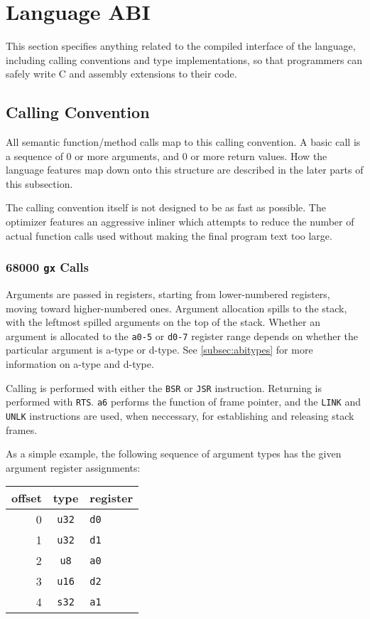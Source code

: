 \section{Language ABI}
\label{sec:abi}

This section specifies anything related to the compiled interface of
the language, including calling conventions and type implementations,
so that programmers can safely write C and assembly extensions to their
\gx{} code.

\subsection{Calling Convention}

All semantic function/method calls map to this calling convention. A
basic call is a sequence of 0 or more arguments, and 0 or more return
values. How the language features map down onto this structure are
described in the later parts of this subsection.

The calling convention itself is not designed to be as fast as
possible. The optimizer features an aggressive inliner which attempts
to reduce the number of actual function calls used without making the
final program text too large.

\subsubsection{68000 {\tt gx} Calls}

Arguments are passed in registers, starting from lower-numbered registers,
moving toward higher-numbered ones. Argument allocation spills to the
stack, with the leftmost spilled arguments on the top of the stack.
Whether an argument is allocated to the {\tt a0-5} or {\tt d0-7} register
range depends on whether the particular argument is a-type or d-type.
See \ref{subsec:abitypes} for more information on a-type and d-type.

Calling is performed with either the {\tt BSR} or {\tt JSR}
instruction. Returning is performed with {\tt RTS}. {\tt a6} performs the
function of frame pointer, and the {\tt LINK} and {\tt UNLK} instructions
are used, when neccessary, for establishing and releasing stack frames.

As a simple example, the following sequence of argument types has the
given argument register assignments:

\begin{center}\begin{tabular}{r|c|l}
offset  & type        & register  \\ \hline
0       & {\tt  u32}  & {\tt d0}  \\
1       & {\tt  u32}  & {\tt d1}  \\
2       & {\tt  *u8}  & {\tt a0}  \\
3       & {\tt  u16}  & {\tt d2}  \\
4       & {\tt *s32}  & {\tt a1}
\end{tabular}\end{center}

